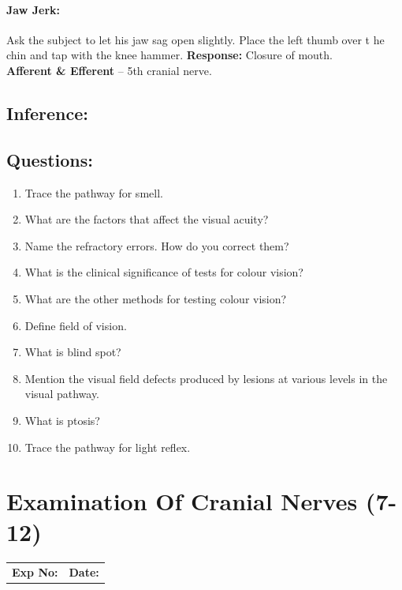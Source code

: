 \documentclass[a4paper,12pt,openany,oneside]{book}
\begin{document}
\subsubsection*{Jaw Jerk:}
Ask the subject to let his jaw sag open slightly. Place the left thumb over t he chin and tap with the knee hammer.
\textbf{Response:} Closure of mouth.\\
\textbf{Afferent \& Efferent} – 5th   cranial nerve.

\section*{Inference:}
\vspace{1in}

\section*{Questions:}
\begin{enumerate}
\item{ Trace the pathway for smell.}
\item{ What are the factors that affect the visual acuity?}
\item{ Name the refractory errors. How do you correct them?}
\item{ What  is the clinical significance of tests for colour vision?}
\item{ What  are the other methods for testing colour vision?}
\item{ Define field of vision.}
\item{ What is blind spot?}
\item{ Mention the visual field defects produced by lesions at various levels in the visual pathway.}
\item{ What is ptosis?}
\item{ Trace the pathway for light reflex.}
\end{enumerate}
														\chapter*{\centering Examination Of Cranial Nerves (7-12)}
															\begin{tabular}{p{5in} p{1in}}
																\textbf{Exp No:}  & \textbf{Date:}\\
															\end{tabular}
\end{document}
